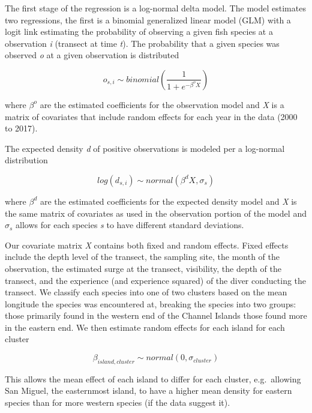 \documentclass[]{article}
\begin{document}
\pagebreak

The first stage of the regression is a log-normal delta model. The model estimates two regressions, the first is a binomial generalized linear model (GLM) with a logit link estimating the probability of observing a given fish species at a observation \emph{i} (transect at time \emph{t}). The probability that a given species was observed \emph{o} at a given observation is distributed

\begin{equation}
o_{s,i} \sim binomial(\frac{1}{1 +e^{-\beta^{o}{X}}})
  \label{eq:binom}
\end{equation}

where \(\beta^{o}\) are the estimated coefficients for the observation model and \emph{X} is a matrix of covariates that include random effects for each year in the data (2000 to 2017).

The expected density \emph{d} of positive observations is modeled per a log-normal distribution

\begin{equation}
  log(d_{s,i}) \sim normal(\beta^{d}X, \sigma_s)
   \label{eq:logd}
 \end{equation}

where \(\beta^{d}\) are the estimated coefficients for the expected density model and \emph{X} is the same matrix of covariates as used in the observation portion of the model and \(\sigma_s\) allows for each species \emph{s} to have different standard deviations.

Our covariate matrix \emph{X} contains both fixed and random effects. Fixed effects include the depth level of the transect, the sampling site, the month of the observation, the estimated surge at the transect, visibility, the depth of the transect, and the experience (and experience squared) of the diver conducting the transect. We classify each species into one of two clusters based on the mean longitude the species was encountered at, breaking the species into two groups: those primarily found in the western end of the Channel Islands those found more in the eastern end. We then estimate random effects for each island for each cluster

\begin{equation}
\beta_{island,cluster} \sim normal(0,\sigma_{cluster})
  \label{eq:island}
\end{equation}

This allows the mean effect of each island to differ for each cluster, e.g.~allowing San Miguel, the easternmost island, to have a higher mean density for eastern species than for more western species (if the data suggest it).
\end{document}

